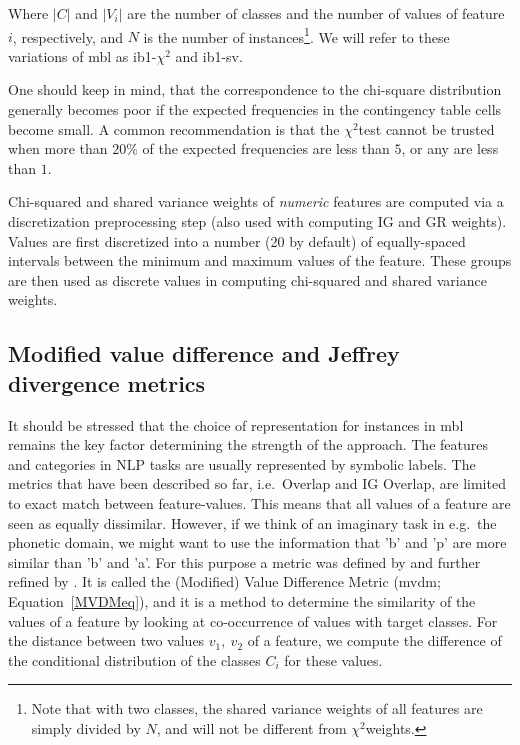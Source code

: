 \documentclass{report}
\newcommand{\chisq}{{$ \chi^2 $}}
\begin{document}
Where $|C|$ and $|V_{i}|$ are the number of classes and the number of
values of feature $i$, respectively, and $N$ is the number of
instances\footnote{Note that with two classes, the shared variance
weights of all features are simply divided by $N$, and will not be
different from \chisq weights.}. We will refer to these
variations of {\sc mbl} as {\sc ib1-\chisq} and {\sc ib1-sv}.

One should keep in mind, that the correspondence to the chi-square
distribution generally becomes poor if the expected frequencies in the
contingency table cells become small. A common recommendation is that
the \chisq test cannot be trusted when more than $20\%$ of the
expected frequencies are less than $5$, or any are less than $1$.

Chi-squared and shared variance weights of {\em numeric}\/ features are
computed via a discretization preprocessing step (also used with
computing IG and GR weights). Values are first discretized into a
number (20 by default) of equally-spaced intervals between the
minimum and maximum values of the feature. These groups are then used
as discrete values in computing chi-squared and shared variance weights.

\subsection{Modified value difference and Jeffrey divergence metrics}
\label{mvdm}

It should be stressed that the choice of representation for instances
in {\sc mbl} remains the key factor determining the strength of the
approach. The features and categories in NLP tasks are usually
represented by symbolic labels. The metrics that have been described
so far, i.e.~Overlap and IG Overlap, are limited to exact match
between feature-values. This means that all values of a feature are
seen as equally dissimilar. However, if we think of an imaginary task
in e.g.~the phonetic domain, we might want to use the information that
'b' and 'p' are more similar than 'b' and 'a'. For this purpose a
metric was defined by  and further refined by
. It is called the (Modified) Value Difference
Metric ({\sc mvdm}; Equation~\ref{MVDMeq}), and it is a method to
determine the similarity of the values of a feature by looking at
co-occurrence of values with target classes. For the distance between
two values $v_{1},\ v_{2}$ of a feature, we compute the difference of
the conditional distribution of the classes $C_{i}$ for these values.
\end{document}
